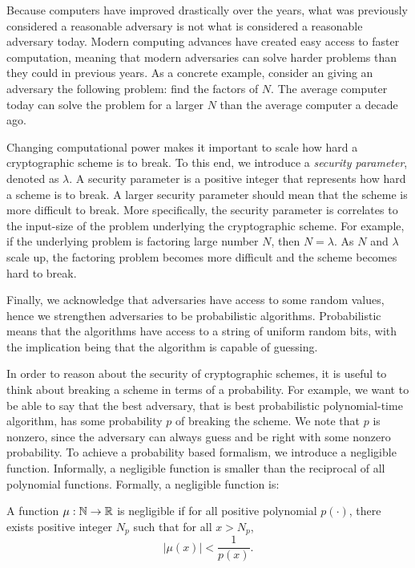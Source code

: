 Because computers have improved drastically over the years, what was previously considered a reasonable adversary is not what is considered a reasonable adversary today. 
Modern computing advances have created easy access to faster computation, meaning that modern adversaries can solve harder problems than they could in previous years. 
As a concrete example, consider an giving an adversary the following problem: find the factors of $N$. 
The average computer today can solve the problem for a larger $N$ than the average computer a decade ago.

Changing computational power makes it important to scale how hard a cryptographic scheme is to break.
To this end, we introduce a \textit{security parameter}, denoted as $\lambda$.
A security parameter is a positive integer that represents how hard a scheme is to break. 
A larger security parameter should mean that the scheme is more difficult to break. 
More specifically, the security parameter is correlates to the input-size of the problem underlying the cryptographic scheme. 
For example, if the underlying problem is factoring large number $N$, then $N = \lambda$. 
As $N$ and $\lambda$ scale up, the factoring problem becomes more difficult and the scheme becomes hard to break. 

Finally, we acknowledge that adversaries have access to some random values, hence we strengthen adversaries to be probabilistic algorithms. 
Probabilistic means that the algorithms have access to a string of uniform random bits, with the implication being that the algorithm is capable of guessing. 

In order to reason about the security of cryptographic schemes, it is useful to think about breaking a scheme in terms of a probability. 
For example, we want to be able to say that the best adversary, that is best probabilistic polynomial-time algorithm, has some probability $p$ of breaking the scheme. 
We note that $p$ is nonzero, since the adversary can always guess and be right with some nonzero probability. 
To achieve a probability based formalism, we introduce a negligible function.
Informally, a negligible function is smaller than the reciprocal of all polynomial functions. 
Formally, a negligible function is:

\begin{definition}
\label{defn:negible}
A function $\mu : \mathbb{N} \to \mathbb{R}$ is negligible if for all positive polynomial $p(\cdot)$, there exists positive integer $N_p$ such that for all $x > N_p$, 
\begin{equation}
    |\mu(x)| < \frac{1}{p(x)}.
\end{equation}
\cite{goldreich}
\end{definition}


